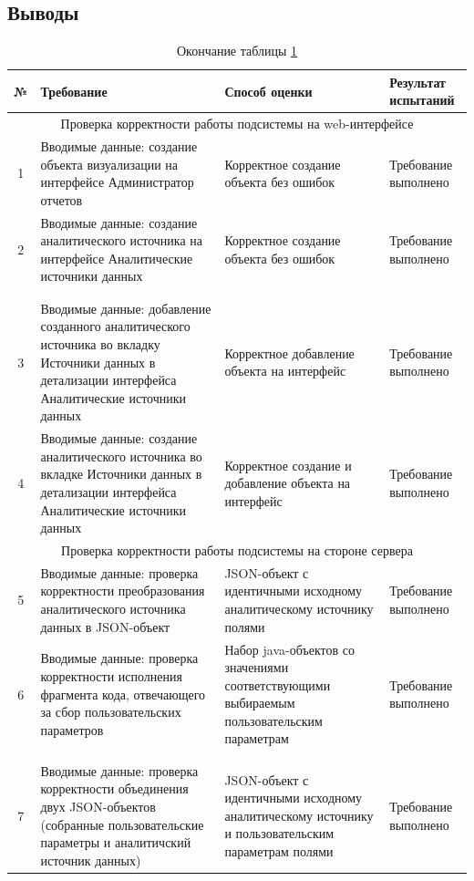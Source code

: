 \documentclass[a4paper]{extarticle}
\numberwithin{equation}{section}
\begin{document}
\subsection{Выводы}
\begin{longtable}[H]{|c|p{}|p{}|p{}|}
  \caption{Результаты испытаний}
  \label{table3} \\\hline
  №  & Требование & Способ оценки & Результат испытаний \\\hline
  \multicolumn{4}{|c|}{Проверка корректности работы подсистемы на web-интерфейсе} \\\hline
  1  & Вводимые данные: создание объекта визуализации на интерфейсе Администратор отчетов & Корректное создание объекта без ошибок & Требование выполнено\\\hline
  2  & Вводимые данные: создание аналитического источника на интерфейсе Аналитические источники данных & Корректное создание объекта без ошибок & Требование выполнено \\
  \multicolumn{4}{l}{}\\
  \caption*{Продолжение таблицы \ref{table3}} \\\hline
  3  & Вводимые данные: добавление созданного аналитического источника во вкладку Источники данных в детализации интерфейса Аналитические источники данных & Корректное добавление объекта на интерфейс & Требование выполнено \\\hline
  4  & Вводимые данные: создание аналитического источника во вкладке Источники данных в детализации интерфейса Аналитические источники данных & Корректное создание и добавление объекта на интерфейс & Требование выполнено \\\hline
  \multicolumn{4}{|c|}{Проверка корректности работы подсистемы на стороне сервера} \\\hline
  5  & Вводимые данные: проверка корректности преобразования аналитического источника данных в JSON-объект & JSON-объект с идентичными исходному аналитическому источнику полями & Требование выполнено \\\hline
  6  & Вводимые данные: проверка корректности исполнения фрагмента кода, отвечающего за сбор пользовательских параметров & Набор java-объектов со значениями соответствующими выбираемым пользовательским параметрам & Требование выполнено \\
  \multicolumn{4}{l}{}\\
  \caption*{Окончание таблицы \ref{table3}} \\\hline
  7  & Вводимые данные: проверка корректности объединения двух JSON-объектов (собранные пользовательские параметры и аналитичский источник данных) & JSON-объект с идентичными исходному аналитическому источнику и пользовательским параметрам полями & Требование выполнено \\\hline
\end{longtable}\par
\end{document}
